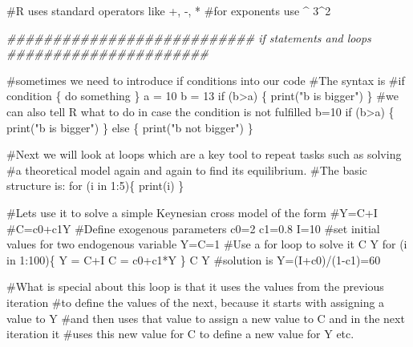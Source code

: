 \documentclass[
  letterpaper,
  DIV=11,
  numbers=noendperiod]{scrreprt}
\newenvironment{Shaded}{\begin{snugshade}}{\end{snugshade}}
\newcommand{\CommentTok}[1]{\textcolor[rgb]{0.37,0.37,0.37}{#1}}
\newcommand{\ControlFlowTok}[1]{\textcolor[rgb]{0.00,0.23,0.31}{#1}}
\newcommand{\DecValTok}[1]{\textcolor[rgb]{0.68,0.00,0.00}{#1}}
\newcommand{\DocumentationTok}[1]{\textcolor[rgb]{0.37,0.37,0.37}{\textit{#1}}}
\newcommand{\FloatTok}[1]{\textcolor[rgb]{0.68,0.00,0.00}{#1}}
\newcommand{\FunctionTok}[1]{\textcolor[rgb]{0.28,0.35,0.67}{#1}}
\newcommand{\NormalTok}[1]{\textcolor[rgb]{0.00,0.23,0.31}{#1}}
\newcommand{\OtherTok}[1]{\textcolor[rgb]{0.00,0.23,0.31}{#1}}
\newcommand{\SpecialCharTok}[1]{\textcolor[rgb]{0.37,0.37,0.37}{#1}}
\newcommand{\StringTok}[1]{\textcolor[rgb]{0.13,0.47,0.30}{#1}}
\begin{document}
\begin{Shaded}
\begin{Highlighting}[]
\CommentTok{\#R uses standard operators like +, {-}, *}
\CommentTok{\#for exponents use \^{}}
\DecValTok{3}\SpecialCharTok{\^{}}\DecValTok{2}


\DocumentationTok{\#\#\#\#\#\#\#\#\#\#\#\#\#\#\#\#\#\#\#\#\#\#\#\#\#\#\# if statements and loops \#\#\#\#\#\#\#\#\#\#\#\#\#\#\#\#\#\#\#\#\#\#}

\CommentTok{\#sometimes we need to introduce if conditions into our code}
\CommentTok{\#The syntax is}
\CommentTok{\#if condition \{ do something \}}
\NormalTok{a }\OtherTok{=} \DecValTok{10}
\NormalTok{b }\OtherTok{=} \DecValTok{13}
\ControlFlowTok{if}\NormalTok{ (b}\SpecialCharTok{\textgreater{}}\NormalTok{a) \{}
  \FunctionTok{print}\NormalTok{(}\StringTok{"b is bigger"}\NormalTok{)}
\NormalTok{\}}
\CommentTok{\#we can also tell R what to do in case the condition is not fulfilled}
\NormalTok{b}\OtherTok{=}\DecValTok{10}
\ControlFlowTok{if}\NormalTok{ (b}\SpecialCharTok{\textgreater{}}\NormalTok{a) \{}
  \FunctionTok{print}\NormalTok{(}\StringTok{"b is bigger"}\NormalTok{)}
\NormalTok{\} }\ControlFlowTok{else}\NormalTok{ \{}
  \FunctionTok{print}\NormalTok{(}\StringTok{"b not bigger"}\NormalTok{)}
\NormalTok{\}}


\CommentTok{\#Next we will look at loops which are a key tool to repeat tasks such as solving}
\CommentTok{\#a theoretical model again and again to find its equilibrium.}
\CommentTok{\#The basic structure is:}
\ControlFlowTok{for}\NormalTok{ (i }\ControlFlowTok{in} \DecValTok{1}\SpecialCharTok{:}\DecValTok{5}\NormalTok{)\{}
  \FunctionTok{print}\NormalTok{(i)}
\NormalTok{\}}

\CommentTok{\#Let\textquotesingle{}s use it to solve a simple Keynesian cross model of the form}
\CommentTok{\#Y=C+I}
\CommentTok{\#C=c0+c1Y}
\CommentTok{\#Define exogenous parameters}
\NormalTok{c0}\OtherTok{=}\DecValTok{2}
\NormalTok{c1}\OtherTok{=}\FloatTok{0.8}
\NormalTok{I}\OtherTok{=}\DecValTok{10}
\CommentTok{\#set initial values for two endogenous variable}
\NormalTok{Y}\OtherTok{=}\NormalTok{C}\OtherTok{=}\DecValTok{1}
\CommentTok{\#Use a for loop to solve it}
\NormalTok{C}
\NormalTok{Y}
\ControlFlowTok{for}\NormalTok{ (i }\ControlFlowTok{in} \DecValTok{1}\SpecialCharTok{:}\DecValTok{100}\NormalTok{)\{}
\NormalTok{  Y }\OtherTok{=}\NormalTok{ C}\SpecialCharTok{+}\NormalTok{I}
\NormalTok{  C }\OtherTok{=}\NormalTok{ c0}\SpecialCharTok{+}\NormalTok{c1}\SpecialCharTok{*}\NormalTok{Y}
\NormalTok{\}}
\NormalTok{C}
\NormalTok{Y}
\CommentTok{\#solution is Y=(I+c0)/(1{-}c1)=60}

\CommentTok{\#What is special about this loop is that it uses the values from the previous iteration}
\CommentTok{\#to define the values of the next, because it starts with assigning a value to Y}
\CommentTok{\#and then uses that value to assign a new value to C and in the next iteration it}
\CommentTok{\#uses this new value for C to define a new value for Y etc.}



\end{Highlighting}
\end{Shaded}
\end{document}
